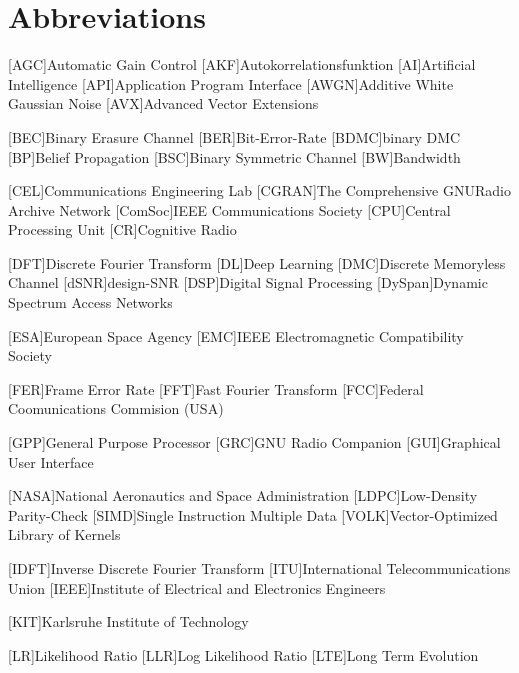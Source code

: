 \chapter{Abbreviations}
\begin{acronym}[TROLL]
  [AGC]{Automatic Gain Control}
  [AKF]{Autokorrelationsfunktion}
  [AI]{Artificial Intelligence}
  [API]{Application Program Interface}
  [AWGN]{Additive White Gaussian Noise}
  [AVX]{Advanced Vector Extensions}

  [BEC]{Binary Erasure Channel}
  [BER]{Bit-Error-Rate}
  [BDMC]{binary \acs{DMC}}
  [BP]{Belief Propagation}
  [BSC]{Binary Symmetric Channel}
  [BW]{Bandwidth}

  [CEL]{Communications Engineering Lab}
  [CGRAN]{The Comprehensive GNURadio Archive Network}
  [ComSoc]{IEEE Communications Society}
  [CPU]{Central Processing Unit}
  [CR]{Cognitive Radio}

  [DFT]{Discrete Fourier Transform}
  [DL]{Deep Learning}
  [DMC]{Discrete Memoryless Channel}
  [dSNR]{design-\ac{SNR}}
  [DSP]{Digital Signal Processing}
  [DySpan]{Dynamic Spectrum Access Networks}

  [ESA]{European Space Agency}
  [EMC]{IEEE Electromagnetic Compatibility Society}

  [FER]{Frame Error Rate}
  [FFT]{Fast Fourier Transform}
  [FCC]{Federal Coomunications Commision (USA)}

  [GPP]{General Purpose Processor}
  [GRC]{GNU Radio Companion}
  [GUI]{Graphical User Interface}

  [NASA]{National Aeronautics and Space Administration}
  [LDPC]{Low-Density Parity-Check}
  [SIMD]{Single Instruction Multiple Data}
  [VOLK]{Vector-Optimized Library of Kernels}

  [IDFT]{Inverse Discrete Fourier Transform}
  [ITU]{International Telecommunications Union}
  [IEEE]{Institute of Electrical and Electronics Engineers}

  [KIT]{Karlsruhe Institute of Technology}

  [LR]{Likelihood Ratio}
  [LLR]{Log Likelihood Ratio}
  [LTE]{Long Term Evolution}


\end{acronym}
